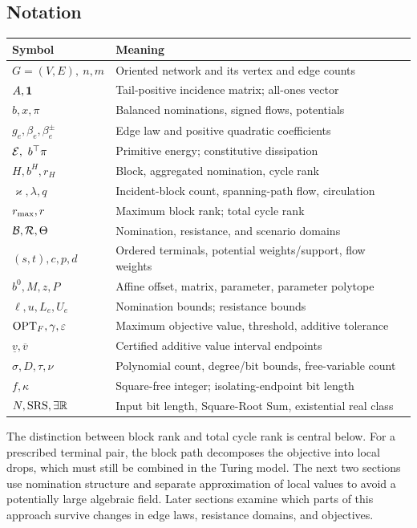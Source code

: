 \subsection{Notation}
\label{subsec:a-pre-notation}
\begin{center}
\small
\begin{tabular}{@{}ll@{}}
\toprule
Symbol & Meaning \\
\midrule
$G=(V,E),\ n,m$ & Oriented network and its vertex and edge counts \\
$A,\mathbf{1}$ & Tail-positive incidence matrix; all-ones vector \\
$b,x,\pi$ & Balanced nominations, signed flows, potentials \\
$g_e,\beta_e,\beta_e^\pm$ & Edge law and positive quadratic coefficients \\
$\energy,\ b^\top\pi$ & Primitive energy; constitutive dissipation \\
$H,b^H,r_H$ & Block, aggregated nomination, cycle rank \\
$\varkappa,\lambda,q$ & Incident-block count, spanning-path flow, circulation \\
$r_{\max},r$ & Maximum block rank; total cycle rank \\
$\mathcal{B},\mathcal{R},\Theta$ & Nomination, resistance, and scenario domains \\
$(s,t),c,p,d$ & Ordered terminals, potential weights/support, flow weights \\
$b^0,M,z,P$ & Affine offset, matrix, parameter, parameter polytope \\
$\ell,u,L_e,U_e$ & Nomination bounds; resistance bounds \\
$\mathrm{OPT}_F,\gamma,\varepsilon$ & Maximum objective value, threshold, additive tolerance \\
$\underline{v},\overline{v}$ & Certified additive value interval endpoints \\
$\sigma,D,\tau,\nu$ & Polynomial count, degree/bit bounds, free-variable count \\
$f,\kappa$ & Square-free integer; isolating-endpoint bit length \\
$N,\mathrm{SRS},\exists\mathbb{R}$ & Input bit length, Square-Root Sum, existential real class \\
\bottomrule
\end{tabular}
\end{center}

The distinction between block rank and total cycle rank is central
below. For a prescribed terminal pair, the block path decomposes the
objective into local drops, which must still be combined in the Turing
model. The next two sections use nomination structure and separate
approximation of local values to avoid a potentially large algebraic
field. Later sections examine which parts of this approach survive
changes in edge laws, resistance domains, and objectives.
